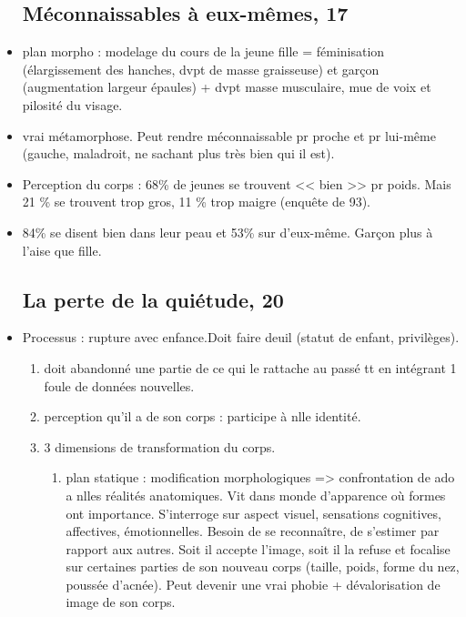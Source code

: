 \documentclass[12pt]{report}
\begin{document}
\begin{itemize}
\subsection{Méconnaissables à eux-mêmes, 17}

\item plan morpho : modelage du cours de la jeune fille = féminisation (élargissement des hanches, dvpt de masse graisseuse) et garçon (augmentation largeur épaules) + dvpt masse musculaire, mue de voix et pilosité du visage. \\

\item vrai métamorphose. Peut rendre méconnaissable pr proche et pr lui-même (gauche, maladroit, ne sachant plus très bien qui il est). \\

\item Perception du corps : 68\% de jeunes se trouvent << bien >> pr poids. Mais 21 \% se trouvent trop gros, 11 \% trop maigre (enquête de 93). \\

\item 84\% se disent bien dans leur peau et 53\% sur d'eux-même. Garçon plus à l'aise que fille.

\subsection{La perte de la quiétude, 20}

\item Processus : rupture avec enfance.Doit faire deuil (statut de enfant, privilèges). 
\begin{enumerate}
\item doit abandonné une partie de ce qui le rattache au passé tt en intégrant 1 foule de données nouvelles. \\
\item perception qu'il a de son corps : participe à nlle identité. \\
\item 3 dimensions de transformation du corps.
\begin{enumerate}
\item plan statique : modification morphologiques => confrontation de ado a nlles réalités anatomiques. Vit dans monde d'apparence où formes ont importance. S'interroge sur aspect visuel, sensations cognitives, affectives, émotionnelles. Besoin de se reconnaître, de s'estimer par rapport aux autres. Soit il accepte l'image, soit il la refuse et focalise sur certaines parties de son nouveau corps (taille, poids, forme du nez, poussée d'acnée). Peut devenir une vrai phobie + dévalorisation de image de son corps.\\


\end{enumerate}
\end{enumerate}
\end{itemize}
\end{document}
